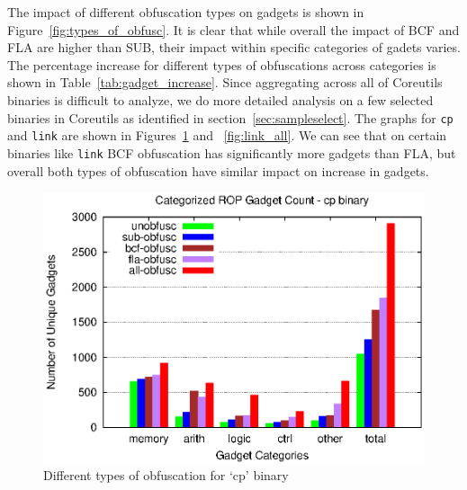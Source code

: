 The impact of different obfuscation types on gadgets is shown in 
Figure~\ref{fig:types_of_obfusc}. It is clear that while overall the 
impact of BCF and FLA are higher than SUB, their impact within specific 
categories of gadets varies. The percentage increase for different types 
of obfuscations across categories is shown in 
Table~\ref{tab:gadget_increase}. Since aggregating across all of Coreutils 
binaries is difficult to analyze, we do more detailed analysis on a few 
selected binaries in Coreutils as identified in 
section~\ref{sec:sampleselect}. The graphs for \texttt{cp} and 
\texttt{link} are shown in Figures~\ref{fig:cp_all} and  
~\ref{fig:link_all}. We can see that on certain binaries like 
\texttt{link} BCF obfuscation has significantly more gadgets than FLA, but 
overall both types of obfuscation have similar impact on increase in 
gadgets. 

\begin{figure}[h]
    \includegraphics[width=\linewidth]{figures/cp-all.eps}
    \captionsetup{font=footnotesize, labelfont=bf, justification=centering}
    \caption{Different types of obfuscation for `cp' binary}
    \label{fig:cp_all}
\end{figure}


